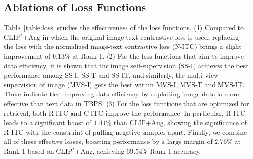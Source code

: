 \documentclass[letterpaper]{article} %
\begin{document}
\subsection{Ablations of Loss Functions}
Table~\ref{table:loss} studies the effectiveness of the loss functions.
(1) Compared to CLIP$^*$+Aug in which the original image-text contrastive loss is used, replacing the loss with the normalized image-text contrastive loss (N-ITC) brings a slight improvement of $0.13\%$ at Rank-1.
(2) For the loss functions that aim to improve data efficiency, it is shown that the image self-supervision (SS-I) achieves the best performance among SS-I, SS-T and SS-IT, and similarly, the multi-view supervision of image (MVS-I) gets the best within MVS-I, MVS-T and MVS-IT. These indicate that improving data efficiency by exploiting image data is more effective than text data in TBPS.
(3) For the loss functions that are optimized for retrieval, both R-ITC and C-ITC improve the performance. In particular, R-ITC leads to a significant boost of $1.41\%$ than CLIP+Aug, showing the significance of R-ITC with the constraint of pulling negative samples apart.
Finally, we combine all of these effective losses, boosting performance by a large margin of $2.76\%$ at Rank-1 based on CLIP$^*$+Aug, achieving $69.54\%$ Rank-1 accuracy.




\end{document}
